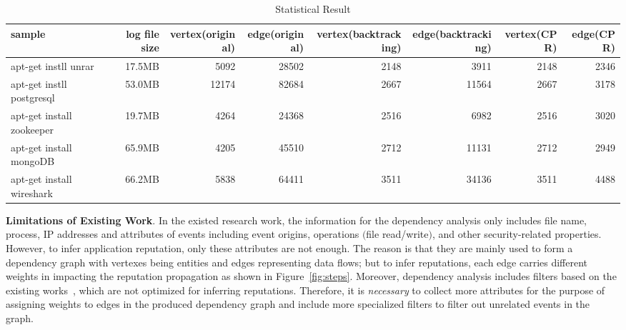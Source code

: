 \begin{table*}
	\centering
	\caption{Statistical Result}
	\label{my-label}
	\begin{scriptsize}
		\begin{tabular}{|p{1.5cm}|r|r|r|r|r|r|r|}
			\hline
			sample                    & log file size & vertex(original) & edge(original) & vertex(backtracking) & edge(backtracking) & vertex(CPR) & edge(CPR) \\ \hline
			apt-get instll unrar      & 17.5MB        & 5092             & 28502          & 2148                 & 3911               & 2148        & 2346      \\ \hline
			apt-get instll postgresql & 53.0MB        & 12174            & 82684          & 2667                 & 11564              & 2667        & 3178      \\ \hline
			apt-get install zookeeper & 19.7MB        & 4264             & 24368          & 2516                 & 6982               & 2516        & 3020      \\ \hline
			apt-get install mongoDB   & 65.9MB        & 4205             & 45510          & 2712                 & 11131              & 2712        & 2949      \\ \hline
			apt-get install wireshark & 66.2MB        & 5838             & 64411          & 3511                 & 34136              & 3511        & 4488      \\ \hline
		\end{tabular}%
	\end{scriptsize}
	
\end{table*}


\textbf{Limitations of Existing Work}.
In the existed research work, the information for the dependency analysis only includes file name, process, IP addresses and attributes of events including event origins, operations $($file read/write$)$, and other security-related properties. However, to infer application reputation, only these attributes are not enough.
The reason is that they are mainly used to form a dependency graph with vertexes being entities and edges representing data flows;
but to infer reputations, each edge carries different weights in impacting the reputation propagation as shown in Figure~\ref{fig:steps}.
Moreover, dependency analysis includes filters based on the existing works~\cite{backtracking,backtracking2}, which are not optimized for inferring reputations.
Therefore, it is \emph{necessary} to collect more attributes for the purpose of assigning weights to edges in the produced dependency graph and include more specialized filters to filter out unrelated events in the graph. 

